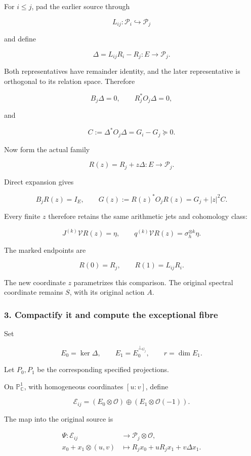 For \(i\le j\), pad the earlier source through

\[
L_{ij}:\mathcal P_i\hookrightarrow\mathcal P_j
\]

and define

\[
\boxed{
\Delta=L_{ij}R_i-R_j:E\longrightarrow\mathcal P_j.
}
\]

Both representatives have remainder identity, and the later representative is orthogonal to its relation space. Therefore

\[
B_j\Delta=0,\qquad R_j^*O_j\Delta=0,
\]

and

\[
\boxed{
C:=\Delta^*O_j\Delta=G_i-G_j\succeq0.
}
\]

Now form the actual family

\[
\boxed{
R(z)=R_j+z\Delta:E\longrightarrow\mathcal P_j.
}
\]

Direct expansion gives

\[
\boxed{
B_jR(z)=I_E,\qquad
G(z):=R(z)^*O_jR(z)=G_j+|z|^2C.
}
\]

Every finite \(z\) therefore retains the same arithmetic jets and cohomology class:

\[
J^{(k)}\mathcal VR(z)=\eta,
\qquad
q^{(k)}\mathcal VR(z)=\sigma_h^{\otimes k}\eta.
\]

The marked endpoints are

\[
R(0)=R_j,\qquad R(1)=L_{ij}R_i.
\]

The new coordinate \(z\) parametrizes this comparison. The original spectral coordinate remains \(S\), with its original action \(A\).

\subsubsection{3. Compactify it and compute the exceptional fibre}\label{endpoint-curvature_original--compactify-it-and-compute-the-exceptional-fibre}

Set

\[
E_0=\ker\Delta,\qquad
E_1=E_0^{\perp_{G_j}},\qquad
r=\dim E_1.
\]

Let \(P_0,P_1\) be the corresponding specified projections.

On \(\mathbb P^1_{\mathbb C}\), with homogeneous coordinates \([u:v]\), define

\[
\boxed{
\mathscr E_{ij}
=
(E_0\otimes\mathcal O)
\oplus
(E_1\otimes\mathcal O(-1)).
}
\]

The map into the original source is

\[
\boxed{
\begin{aligned}
\Psi:\mathscr E_{ij}&\longrightarrow\mathcal P_j\otimes\mathcal O,\\
x_0+x_1\otimes(u,v)
&\longmapsto R_jx_0+uR_jx_1+v\Delta x_1.
\end{aligned}
}
\]


